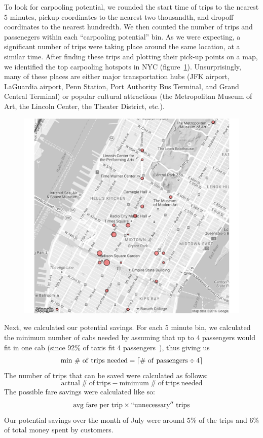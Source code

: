 \documentclass[twocolumn]{article}
\DeclarePairedDelimiter{\ceil}{\lceil}{\rceil}
\begin{document}
To look for carpooling potential, we rounded the start time of trips to the nearest 5 minutes, pickup coordinates to the nearest two thousandth, and  dropoff coordinates to the nearest hundredth. We then counted the number of trips and passenegers within each ``carpooling potential'' bin. As we were expecting, a significant number of trips were taking place around the same location, at a similar time. After finding these trips and plotting their pick-up points on a map, we identified the top carpooling hotspots in NYC (figure~\ref{fig:hotspots}). Unsurprisingly, many of these places are either major transportation hubs (JFK airport, LaGuardia airport, Penn Station, Port Authority Bus Terminal, and Grand Central Terminal) or popular cultural attractions (the Metropolitan Museum of Art, the Lincoln Center, the Theater District, etc.). 
\begin{figure}[h]
  \centering
  \includegraphics[width=.9\linewidth]{top_25_hotspots}
  \label{fig:hotspots}
\end{figure}

Next, we calculated our potential savings. For each 5 minute bin, we calculated the minimum number of cabs needed by assuming that up to 4 passengers would fit in one cab (since 92\% of taxis fit 4 passengers~\cite{TLC:2007}), thus giving us $$\mathrm{min~\#~of~trips~needed} = \ceil{\mathrm{\#~of~passengers}\div4}$$ The number of trips that can be saved were calculated as follows: $$\mathrm{actual~\#~of~trips} - \mathrm{minimum~\#~of~trips~needed}$$ The possible fare savings were calculated like so: $$\mathrm{avg~fare~per~trip}\times\mathrm{``unnecessary''~trips}$$ Our potential savings over the month of July were around 5\% of the trips and 6\% of total money spent by customers.
\end{document}

